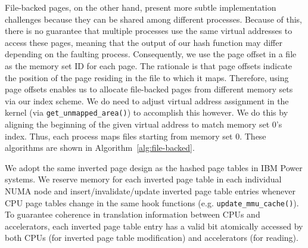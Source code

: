 File-backed pages, on the other hand, present more subtle
implementation challenges because they can be shared among different
processes. Because of this, there is no guarantee that multiple
processes use the same virtual addresses to access these pages,
meaning that the output of our hash function may differ depending on
the faulting process. Consequently, we use the page offset in a file
as the memory set ID for each page. The rationale is that page offsets
indicate the position of the page residing in the file to which it
maps. Therefore, using page offsets enables us to allocate file-backed
pages from different memory sets via our index scheme. We do need to
adjust virtual address assignment in the kernel (via
\verb|get_unmapped_area()|) to accomplish this however. We do this by
aligning the beginning of the given virtual address to match memory
set 0's index. Thus, each process maps files starting from memory set
0. These algorithms are shown in Algorithm~\ref{alg:file-backed}.


\vspace{2mm}
 We adopt the same inverted
page design as the hashed page tables in IBM Power systems. We reserve
memory for each inverted page table in each individual NUMA node and
insert/invalidate/update inverted page table entries whenever CPU page
tables change in the same hook functions
(e.g. \verb|update_mmu_cache()|). To guarantee coherence in
translation information between CPUs and accelerators, each inverted
page table entry has a valid bit atomically accessed by both CPUs (for
inverted page table modification) and accelerators (for
reading). 

